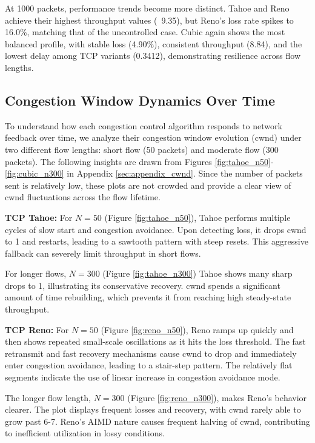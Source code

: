 \documentclass[conference]{IEEEtran}
\begin{document}
At 1000 packets, performance trends become more distinct. 
Tahoe and Reno achieve their highest throughput values (~9.35), but Reno’s loss rate spikes to 16.0\%, matching that of the uncontrolled case. 
Cubic again shows the most balanced profile, with stable loss (4.90\%), consistent throughput (8.84), and the lowest delay among TCP variants (0.3412), demonstrating resilience across flow lengths.

\subsection{Congestion Window Dynamics Over Time}
To understand how each congestion control algorithm responds to network feedback over time, we analyze their congestion window evolution (cwnd) under two different flow lengths: short flow (50 packets) and moderate flow (300 packets). 
The following insights are drawn from Figures \ref{fig:tahoe_n50}-\ref{fig:cubic_n300} in Appendix \ref{sec:appendix_cwnd}.
Since the number of packets sent is relatively low, these plots are not crowded and provide a clear view of cwnd fluctuations across the flow lifetime.

\noindent \textbf{TCP Tahoe:} For $N=50$ (Figure \ref{fig:tahoe_n50}), Tahoe performs multiple cycles of slow start and congestion avoidance. 
Upon detecting loss, it drops cwnd to 1 and restarts, leading to a sawtooth pattern with steep resets.
This aggressive fallback can severely limit throughput in short flows.

For longer flows, $N=300$ (Figure \ref{fig:tahoe_n300}) Tahoe shows many sharp drops to 1, illustrating its conservative recovery. 
cwnd spends a significant amount of time rebuilding, which prevents it from reaching high steady-state throughput.

\noindent \textbf{TCP Reno:} For $N=50$ (Figure \ref{fig:reno_n50}), Reno ramps up quickly and then shows repeated small-scale oscillations as it hits the loss threshold. 
The fast retransmit and fast recovery mechanisms cause cwnd to drop and immediately enter congestion avoidance, leading to a stair-step pattern.
The relatively flat segments indicate the use of linear increase in congestion avoidance mode.

The longer flow length, $N=300$ (Figure \ref{fig:reno_n300}), makes Reno's behavior clearer. 
The plot displays frequent losses and recovery, with cwnd rarely able to grow past 6-7.
Reno's AIMD nature causes frequent halving of cwnd, contributing to inefficient utilization in lossy conditions.
\end{document}
